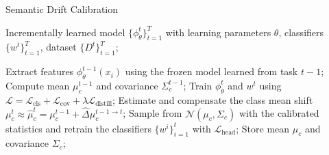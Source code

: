 \begin{algorithm}[h]
\caption{Semantic Drift Calibration }\label{alg:algorithm}
\begin{algorithmic}[1]
\REQUIRE Incrementally learned model $\{\phi^t_{\theta}\}^T_{t=1}$ with learning parameters $\theta$, classifiers $\{w^t\}_{t=1}^T$, dataset $\{D^t\}_{t=1}^T$;

        \STATE Extract features $\phi_{\theta}^{t-1}(x_i)$ using the frozen model learned from task $t-1$;
        \STATE Compute mean $\mu_c^{t-1}$ and covariance $\Sigma_c^{t-1}$;
    \ENDFOR
        \STATE Train $\phi_{\theta}^{t}$ and $w^t$ using $\mathcal{L} = \mathcal{L}_{\text{cls}} + \mathcal{L}_{\text{cov}} + \lambda \mathcal{L}_{\text{distill}}$;
    \ENDFOR
        \STATE Estimate and compensate the class mean shift $\mu_c^t \approx\hat\mu_c^t = \mu_c^{t-1} + \hat{\Delta} \mu_c^{t-1 \rightarrow t}$;
        \STATE Sample from $\mathcal{N}(\mu_c, \Sigma_c)$ with the calibrated statistics and retrain the classifiers $\{w^i\}_{i=1}^{t}$ with $\mathcal{L}_{\text{head}}$;
        \STATE Store mean $\mu_c$ and covariance $\Sigma_c$;
    \ENDFOR
\ENDFOR
\end{algorithmic}
\end{algorithm}
\vspace{-5mm}
